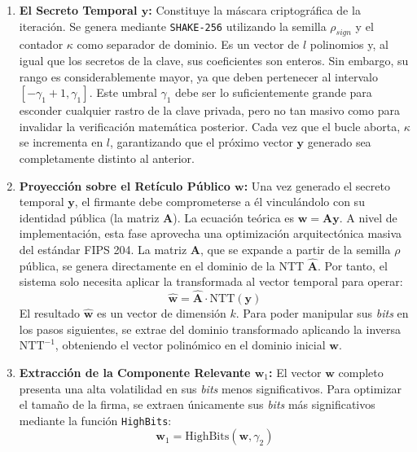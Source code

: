\documentclass[11pt, a4paper]{report}
\theoremstyle{definition}
\begin{document}
\begin{enumerate}
    \item \textbf{El Secreto Temporal $\mathbf{y}$:} Constituye la máscara criptográfica de la iteración. Se genera mediante \texttt{SHAKE-256} utilizando la semilla $\rho_{sign}$ y el contador $\kappa$ como separador de dominio. Es un vector de $l$ polinomios y, al igual que los secretos de la clave, sus coeficientes son enteros. Sin embargo, su rango es considerablemente mayor, ya que deben pertenecer al intervalo $[-\gamma_1 + 1, \gamma_1]$. Este umbral $\gamma_1$ debe ser lo suficientemente grande para esconder cualquier rastro de la clave privada, pero no tan masivo como para invalidar la verificación matemática posterior. Cada vez que el bucle aborta, $\kappa$ se incrementa en $l$, garantizando que el próximo vector $\mathbf{y}$ generado sea completamente distinto al anterior.
    
    \item \textbf{Proyección sobre el Retículo Público $\mathbf{w}$:} Una vez generado el secreto temporal $\mathbf{y}$, el firmante debe comprometerse a él vinculándolo con su identidad pública (la matriz $\mathbf{A}$). La ecuación teórica es $\mathbf{w} = \mathbf{A}\mathbf{y}$. A nivel de implementación, esta fase aprovecha una optimización arquitectónica masiva del estándar FIPS 204. La matriz $\mathbf{A}$, que se expande a partir de la semilla $\rho$ pública, se genera directamente en el dominio de la NTT $\mathbf{\hat{A}}$. Por tanto, el sistema solo necesita aplicar la transformada al vector temporal para operar:
    \begin{equation}
        \mathbf{\hat{w}} = \mathbf{\hat{A}} \cdot \text{NTT}(\mathbf{y})
    \end{equation}
    El resultado $\mathbf{\hat{w}}$ es un vector de dimensión $k$. Para poder manipular sus \textit{bits} en los pasos siguientes, se extrae del dominio transformado aplicando la inversa $\text{NTT}^{-1}$, obteniendo el vector polinómico en el dominio inicial $\mathbf{w}$.
    
    \item \textbf{Extracción de la Componente Relevante $\mathbf{w}_1$:} El vector $\mathbf{w}$ completo presenta una alta volatilidad en sus \textit{bits} menos significativos. Para optimizar el tamaño de la firma, se extraen únicamente sus \textit{bits} más significativos mediante la función \texttt{HighBits}:
    \begin{equation}
        \mathbf{w}_1 = \text{HighBits}(\mathbf{w}, \gamma_2)
    \end{equation}
\end{enumerate}
\end{document}

